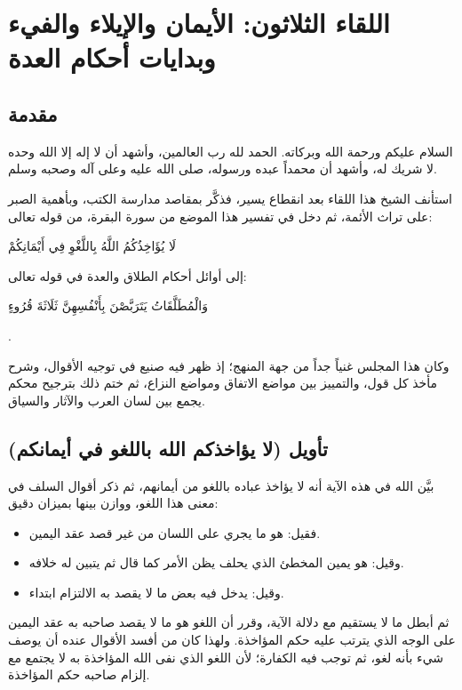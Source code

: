 \chapter{اللقاء الثلاثون: الأيمان والإيلاء والفيء وبدايات أحكام العدة}

\section{مقدمة}
السلام عليكم ورحمة الله وبركاته. الحمد لله رب العالمين، وأشهد أن لا إله إلا الله وحده لا شريك له، وأشهد أن محمداً عبده ورسوله، صلى الله عليه وعلى آله وصحبه وسلم.

استأنف الشيخ هذا اللقاء بعد انقطاع يسير، فذكَّر بمقاصد مدارسة الكتب، وبأهمية الصبر على تراث الأئمة، ثم دخل في تفسير هذا الموضع من سورة البقرة، من قوله تعالى: \begin{ayah}لَا يُؤَاخِذُكُمُ اللَّهُ بِاللَّغْوِ فِي أَيْمَانِكُمْ\end{ayah} إلى أوائل أحكام الطلاق والعدة في قوله تعالى: \begin{ayah}وَالْمُطَلَّقَاتُ يَتَرَبَّصْنَ بِأَنْفُسِهِنَّ ثَلَاثَةَ قُرُوءٍ\end{ayah}.

وكان هذا المجلس غنياً جداً من جهة المنهج؛ إذ ظهر فيه صنيع  في توجيه الأقوال، وشرح مأخذ كل قول، والتمييز بين مواضع الاتفاق ومواضع النزاع، ثم ختم ذلك بترجيح محكم يجمع بين لسان العرب والآثار والسياق.

\separator

\section{تأويل (لا يؤاخذكم الله باللغو في أيمانكم)}
 بيَّن الله في هذه الآية أنه لا يؤاخذ عباده باللغو من أيمانهم، ثم ذكر  أقوال السلف في معنى هذا اللغو، ووازن بينها بميزان دقيق:
\begin{itemize}
    \item فقيل: هو ما يجري على اللسان من غير قصد عقد اليمين.
    \item وقيل: هو يمين المخطئ الذي يحلف يظن الأمر كما قال ثم يتبين له خلافه.
    \item وقيل: يدخل فيه بعض ما لا يقصد به الالتزام ابتداء.
\end{itemize}

ثم أبطل ما لا يستقيم مع دلالة الآية، وقرر أن اللغو هو ما لا يقصد صاحبه به عقد اليمين على الوجه الذي يترتب عليه حكم المؤاخذة. ولهذا كان من أفسد الأقوال عنده أن يوصف شيء بأنه لغو، ثم توجب فيه الكفارة؛ لأن اللغو الذي نفى الله المؤاخذة به لا يجتمع مع إلزام صاحبه حكم المؤاخذة.

